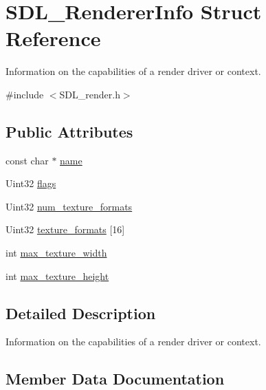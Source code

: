 \hypertarget{struct_s_d_l___renderer_info}{}\section{S\+D\+L\+\_\+\+Renderer\+Info Struct Reference}
\label{struct_s_d_l___renderer_info}


Information on the capabilities of a render driver or context.  




{\ttfamily \#include $<$S\+D\+L\+\_\+render.\+h$>$}

\subsection*{Public Attributes}
\begin{DoxyCompactItemize}
\item 
const char $\ast$ \mbox{\hyperlink{struct_s_d_l___renderer_info_a433ecb2865c81ba9f28038e56a4ae6f3}{name}}
\item 
Uint32 \mbox{\hyperlink{struct_s_d_l___renderer_info_a95cf0ffd1704fd0a4dd8ceac6c9f0542}{flags}}
\item 
Uint32 \mbox{\hyperlink{struct_s_d_l___renderer_info_acdec165b2053b914313f5996983ec6b8}{num\+\_\+texture\+\_\+formats}}
\item 
Uint32 \mbox{\hyperlink{struct_s_d_l___renderer_info_a88450f9d48e593ec4571e3ba7cc3427d}{texture\+\_\+formats}} \mbox{[}16\mbox{]}
\item 
int \mbox{\hyperlink{struct_s_d_l___renderer_info_a6e6757e3d5c1f0922adaba39380edfa6}{max\+\_\+texture\+\_\+width}}
\item 
int \mbox{\hyperlink{struct_s_d_l___renderer_info_a87c6a13e8d535c2148f8913c05e13102}{max\+\_\+texture\+\_\+height}}
\end{DoxyCompactItemize}


\subsection{Detailed Description}
Information on the capabilities of a render driver or context. 

\subsection{Member Data Documentation}
\mbox{\label{struct_s_d_l___renderer_info_a95cf0ffd1704fd0a4dd8ceac6c9f0542}} 
